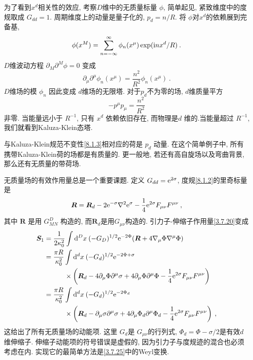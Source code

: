 为了看到$x^{d}$相关性的效应, 考察$D$维中的无质量标量 $\phi$, 简单起见, 紧致维度中的度规取成 $G_{d d}=1$. 周期维度上的动量是量子化的, $p_{d}=n / R$. 
将 $\phi$对$x^{d}$的依赖展到完备基,
\begin{equation}
	\phi(x^{M})=\sum_{n=-\infty}^{\infty} \phi_{n}(x^{\mu}) \exp (\mathrm{i} n x^{d} / R) \:. \label{8.1.5}
\end{equation}
$D$维波动方程 $\partial_{M} \partial^{M} \phi=0$ 变成
\begin{equation}
	\partial_{\mu} \partial^{\mu} \phi_{n}(x^{\mu})=\frac{n^{2}}{R^{2}} \phi_{n}(x^{\mu}) \:. \label{8.1.6}
\end{equation}
$D$维场的模 $\phi_{n}$ 因此变成 $d$维场的无限塔. 对于$p_{d} $不为零的场, $d$维质量平方
\begin{equation}
	-p^{\mu} p_{\mu}=\frac{n^{2}}{R^{2}} \label{8.1.7}
\end{equation}
非零. 当能量远小于 $R^{-1}$, 只有 $x^{d}$ 依赖依旧存在, 而物理是$d$ 维的.当能量超过 $R^{-1}$, 我们就看到Kaluza-Klein态塔.

与Kaluza-Klein规范不变性\eqref{8.1.3}相对应的荷是 $p_{d}$ 动量. 在这个简单例子中, 所有携带Kaluza-Klein荷的场都是有质量的. 
更一般地, 若还有高自旋场以及弯曲背景, 那么还有无质量的带荷场.

无质量场的有效作用量总是一个重要课题. 定义 $G_{d d}=\mathrm{e}^{2 \sigma}$,  度规\eqref{8.1.2}的里奇标量是
\begin{equation}
	\bm{R}=\bm{R}_{d}-2 \mathrm{e}^{-\sigma} \nabla^{2} \mathrm{e}^{\sigma}-\frac{1}{4} \mathrm{e}^{2 \sigma} F_{\mu \nu} F^{\mu \nu} \:, \label{8.1.8}
\end{equation}
其中 $\bm{R}$ 是用 $G_{M N}^{D}$ 构造的,  而$\bm{R}_{d}$是用$G_{\mu \nu} $构造的. 引力子-伸缩子作用量\eqref{3.7.20}变成
\begin{align}
	\bm{S}_{1} &= \frac{1}{2 \kappa_{0}^{2}} \int \mathrm{d}^{D} x \: (-G_{D})^{1/2} \mathrm{e}^{-2 \Phi}(\bm{R}
	 	+4 \nabla_{\mu} \Phi \nabla^{\mu} \Phi) \nonumber \\
		&= \frac{\pi R}{\kappa_{0}^{2}} \int \mathrm{d}^{d} x\: (-G_{d})^{1/2} \mathrm{e}^{-2 \Phi+\sigma} \nonumber \\
		&\qquad \quad \times\left(\bm{R}_{d}-4 \partial_{\mu} \Phi \partial^{\mu} \sigma+
		4 \partial_{\mu} \Phi \partial^{\mu} \Phi-\frac{1}{4} \mathrm{e}^{2 \sigma} F_{\mu \nu} F^{\mu \nu}\right)\nonumber \\
		&= \frac{\pi R}{\kappa_{0}^{2}} \int  \mathrm{d}^{d} x \:(-G_{d})^{1 / 2} \mathrm{e}^{-2 \Phi_{d}} \nonumber \\
		&\qquad\quad \times\left(\bm{R}_{d}-\partial_{\mu} \sigma \partial^{\mu} \sigma+4 \partial_{\mu} \Phi_{d} \partial^{\mu} \Phi_{d}-\frac{1}{4} \mathrm{e}^{2 \sigma} F_{\mu \nu} F^{\mu \nu}\right) \:, \label{8.1.9}
\end{align}
这给出了所有无质量场的动能项. 这里 $G_{d}$是 $G_{\mu \nu}$的行列式, $\Phi_{d}=\Phi-\sigma / 2$是有效$d$维伸缩子. 
伸缩子动能项的符号错误是虚假的, 因为引力子与度规迹的混合也必须考虑在内. 实现它的最简单方法是\eqref{3.7.25}中的Weyl变换.

